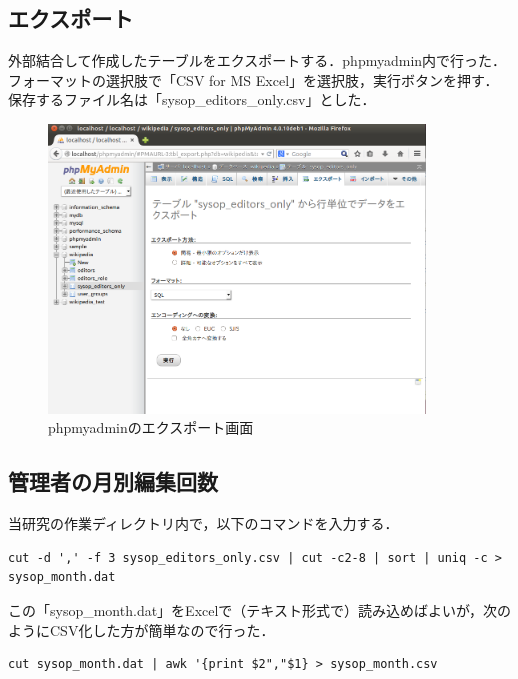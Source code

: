 \clearpage

\subsection{エクスポート}

外部結合して作成したテーブルをエクスポートする．phpmyadmin内で行った．フォーマットの選択肢で「CSV for MS Excel」を選択肢，実行ボタンを押す．保存するファイル名は「sysop\_editors\_only.csv」とした．

\begin{figure}[H]
\centering
\includegraphics[width=10cm]{sysop_editors_only2.png}
\caption{phpmyadminのエクスポート画面}\label{サンプル図}
\end{figure}


\clearpage

\subsection{管理者の月別編集回数}

当研究の作業ディレクトリ内で，以下のコマンドを入力する．

{\small
\begin{verbatim}
cut -d ',' -f 3 sysop_editors_only.csv | cut -c2-8 | sort | uniq -c > sysop_month.dat
\end{verbatim}}

この「sysop\_month.dat」をExcelで（テキスト形式で）読み込めばよいが，次のようにCSV化した方が簡単なので行った．

{\small
\begin{verbatim}
cut sysop_month.dat | awk '{print $2","$1} > sysop_month.csv
\end{verbatim}}




